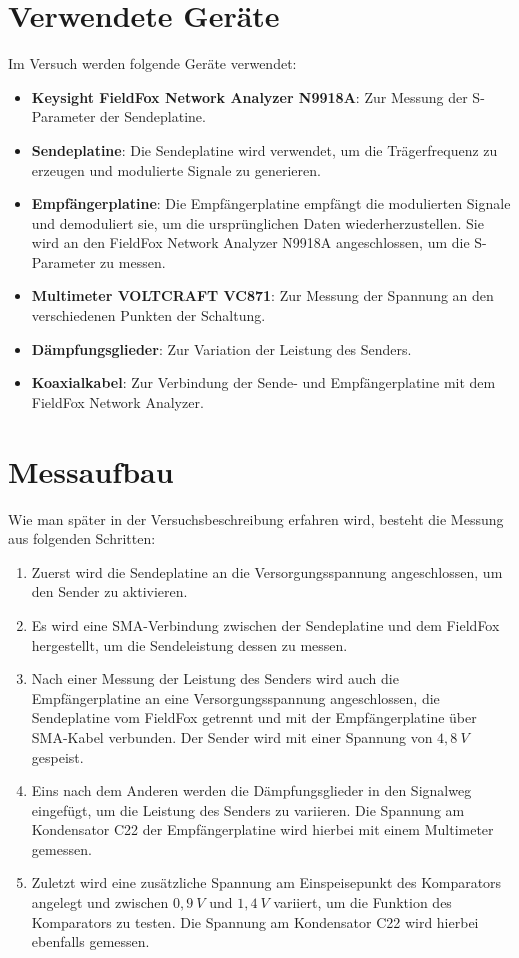 \section{Verwendete Geräte}
Im Versuch werden folgende Geräte verwendet:
\begin{itemize}
    \item \textbf{Keysight FieldFox Network Analyzer N9918A}: Zur Messung der S-Parameter der Sendeplatine.
    \item \textbf{Sendeplatine}: Die Sendeplatine wird verwendet, um die Trägerfrequenz zu erzeugen und modulierte Signale zu generieren.
    \item \textbf{Empfängerplatine}: Die Empfängerplatine empfängt die modulierten Signale und demoduliert sie, um die ursprünglichen Daten wiederherzustellen. Sie wird an den FieldFox Network Analyzer N9918A angeschlossen, um die S-Parameter zu messen.
    \item \textbf{Multimeter VOLTCRAFT VC871}: Zur Messung der Spannung an den verschiedenen Punkten der Schaltung.
    \item \textbf{Dämpfungsglieder}: Zur Variation der Leistung des Senders.
    \item \textbf{Koaxialkabel}: Zur Verbindung der Sende- und Empfängerplatine mit dem FieldFox Network Analyzer.
\end{itemize}
\section{Messaufbau}
Wie man später in der Versuchsbeschreibung erfahren wird, besteht die Messung aus folgenden Schritten:
\begin{enumerate}
    \item Zuerst wird die Sendeplatine an die Versorgungsspannung angeschlossen, um den Sender zu aktivieren.
    \item Es wird eine SMA-Verbindung zwischen der Sendeplatine und dem FieldFox hergestellt, um die Sendeleistung dessen zu messen.
    \item Nach einer Messung der Leistung des Senders wird auch die Empfängerplatine an eine Versorgungsspannung angeschlossen, die Sendeplatine vom FieldFox getrennt und mit der Empfängerplatine über SMA-Kabel verbunden. Der Sender wird mit einer Spannung von $4,8~V$ gespeist.
    \item Eins nach dem Anderen werden die Dämpfungsglieder in den Signalweg eingefügt, um die Leistung des Senders zu variieren. Die Spannung am Kondensator C22 der Empfängerplatine wird hierbei mit einem Multimeter gemessen.
    \item Zuletzt wird eine zusätzliche Spannung am Einspeisepunkt des Komparators angelegt und zwischen $0,9~V$ und $1,4~V$ variiert, um die Funktion des Komparators zu testen. Die Spannung am Kondensator C22 wird hierbei ebenfalls gemessen.
\end{enumerate}
\clearpage